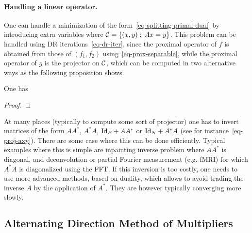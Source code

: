 \paragraph{Handling a linear operator.}

One can handle a minimization of the form~\eqref{eq-splitting-primal-dual} by introducing extra variables
where $\mathcal{C}=\left\{ (x,y) \;;\; Ax=y \right\}$. This problem can be handled using DR iterations~\eqref{eq-dr-iter}, since the proximal operator of $f$ is obtained from those of $(f_1,f_2)$ using~\eqref{eq-prox-separable}, while the proximal operator of $g$ is the projector on $\mathcal{C}$, which can be computed in two alternative ways as the following proposition shows.

\begin{prop}One has
\end{prop}
\begin{proof}
\end{proof}

\begin{rem}\label{rem-inv-lin}
	At many places (typically to compute some sort of projector) one has to invert matrices of the form 
	$AA^*$, $A^*A$, $\mathrm{Id}_P+AA^*$ or $\mathrm{Id}_N+A^*A$ (see for instance~\eqref{eq-proj-axy}).
	There are some case where this can be done efficiently.
	Typical examples where this is simple are inpainting inverse problem where $AA^*$ is diagonal, and deconvolution or partial Fourier measurement (e.g. fMRI) for which $A^*A$ is diagonalized using the FFT.
	If this inversion is too costly, one needs to use more advanced methods, based on duality, which allows to avoid trading the inverse $A$ by the application of $A^*$. They are however typically converging more slowly.
\end{rem}


\subsection{Alternating Direction Method of Multipliers}

